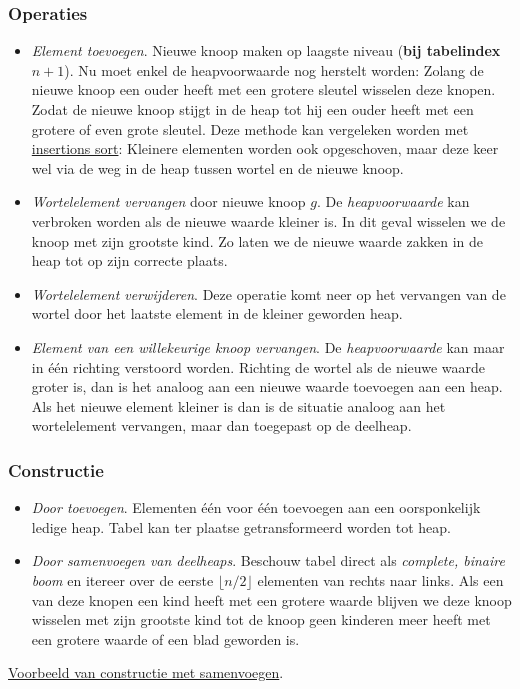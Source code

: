 \documentclass{article}
\begin{document}
\subsubsection{Operaties} %
\label{sub:heaps_operaties}
\begin{itemize}
	\item \textit{Element toevoegen}. Nieuwe knoop maken op laagste niveau (\textbf{bij tabelindex $n + 1$}). Nu moet enkel de heapvoorwaarde nog herstelt worden: Zolang de nieuwe knoop een ouder heeft met een grotere sleutel wisselen deze knopen. Zodat de nieuwe knoop stijgt in de heap tot hij een ouder heeft met een grotere of even grote sleutel. Deze methode kan vergeleken worden met \hyperref[sub:insertion_sort]{insertions sort}: Kleinere elementen worden ook opgeschoven, maar deze keer wel via de weg in de heap tussen wortel en de nieuwe knoop.
	\item \textit{Wortelelement vervangen} door nieuwe knoop $g$. De \textit{heapvoorwaarde} kan verbroken worden als de nieuwe waarde kleiner is. In dit geval wisselen we de knoop met zijn grootste kind. Zo laten we de nieuwe waarde zakken in de heap tot op zijn correcte plaats. 
	\item \textit{Wortelelement verwijderen}. Deze operatie komt neer op het vervangen van de wortel door het laatste element in de kleiner geworden heap.
	\item \textit{Element van een willekeurige knoop vervangen}. De \textit{heapvoorwaarde} kan maar in één richting verstoord worden. Richting de wortel als de nieuwe waarde groter is, dan is het analoog aan een nieuwe waarde toevoegen aan een heap. Als het nieuwe element kleiner is dan is de situatie analoog aan het wortelelement vervangen, maar dan toegepast op de deelheap.
\end{itemize}
\subsubsection{Constructie} %
\label{sub:heaps_constructie}
\begin{itemize}
	\item \textit{Door toevoegen}. Elementen één voor één toevoegen aan een oorsponkelijk ledige heap. Tabel kan ter plaatse getransformeerd worden tot heap.
	\item \textit{Door samenvoegen van deelheaps}. Beschouw tabel direct als \textit{complete, binaire boom} en itereer over de eerste $\lfloor n/2 \rfloor$ elementen van rechts naar links. Als een van deze knopen een kind heeft met een grotere waarde blijven we deze knoop wisselen met zijn grootste kind tot de knoop geen kinderen meer heeft met een grotere waarde of een blad geworden is.
\end{itemize}
\hyperref[sub:heap_sort_voorbeeld]{Voorbeeld van constructie met samenvoegen}.
\end{document}

